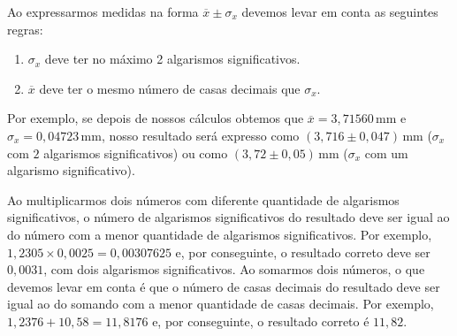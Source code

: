 \documentclass[12pt, a4paper]{article}
\newcommand{\un}[1]{\mathrm{#1}}
\begin{document}
Ao expressarmos medidas na forma $\overline{x}\pm \sigma_x$ devemos levar em conta as seguintes regras:
\begin{enumerate}
	\item $\sigma_x$ deve ter no máximo 2 algarismos significativos.
	\item $\overline{x}$ deve ter o mesmo número de casas decimais que $\sigma_x$.
\end{enumerate}
Por exemplo, se depois de nossos cálculos obtemos que $\overline{x}=3,71560\,\un{mm}$ e $\sigma_x=0,04723\,\un{mm}$, nosso resultado será expresso como $(3,716\pm 0,047)\,\un{mm}$ ($\sigma_x$ com $2$ algarismos significativos) ou como $(3,72\pm 0,05)\,\un{mm}$ ($\sigma_x$ com um algarismo significativo).

Ao multiplicarmos dois números com diferente quantidade de algarismos significativos, o número de algarismos significativos do resultado deve ser igual ao do número com a menor quantidade de algarismos significativos. Por exemplo, $1,2305\times 0,0025=0,00307625$ e, por conseguinte, o resultado correto deve ser $0,0031$, com dois algarismos significativos. Ao somarmos dois números, o que devemos levar em conta é que o número de casas decimais do resultado deve ser igual ao do somando com a menor quantidade de casas decimais. Por exemplo, $1,2376+10,58=11,8176$ e, por conseguinte, o resultado correto é $11,82$.
\end{document}

